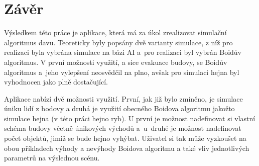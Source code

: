 \documentclass[czech,public,dept460,male,cpdeclaration]{diploma}
\begin{document}
\section{Závěr}
Výsledkem této práce je aplikace, která má za úkol zrealizovat simulační algoritmus davu. Teoreticky byly popsány dvě varianty simulace, z níž pro realizaci byla vybrána simulace na bázi AI a~pro realizaci byl vybrán Boidův algoritmus. V první možnosti využití, a sice evakuace budovy, se Boidův algoritmus a~jeho vylepšení neosvědčil na plno, avšak pro simulaci hejna byl vyhodnocen jako plně dostačující.

Aplikace nabízí dvě možnosti využití. První, jak již bylo zmíněno, je simulace úniku lidí z bodovy a druhá je využití obecného Boidova algoritmu jakožto simulace hejna (v této práci hejno ryb). U první je možnost nadefinovat si vlastní schéma budovy včetně únikových východů a~u~druhé je možnost nadefinovat počet objektů, jimiž se bude hejno vyhýbat. Uživatel si tak může vyzkoušet na obou příkladech výhody a nevýhody Boidova algoritmu a také vliv jednotlivých parametrů na výslednou scénu.

\newpage
\end{document}
